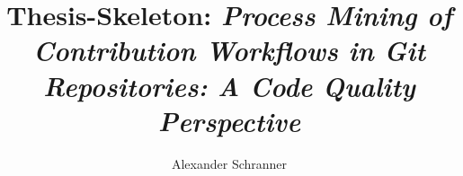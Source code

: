 \documentclass[bachelor]{padsthesis}
\begin{document}
\author{Alexander Schranner}
\title{Thesis-Skeleton: \textit{Process Mining of Contribution Workflows in Git Repositories: A Code Quality Perspective}}

\maketitle

\frontmatter

%



\tableofcontents


\mainmatter

% 










% 







% 
% 
% 
% 
% 
% 
% 
% 
% 


\backmatter
\printbibliography
\end{document}
